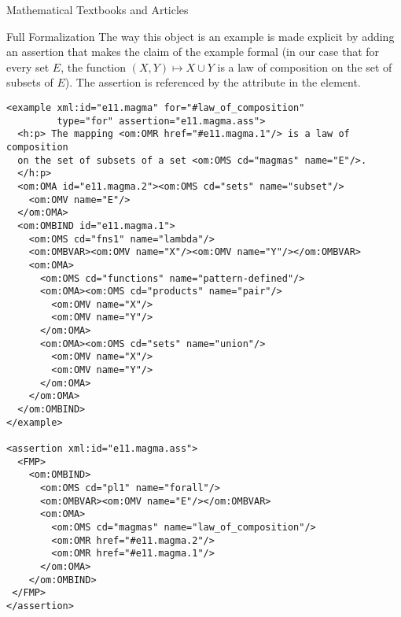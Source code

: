 \begin{omgroup}[short=Textbooks and Articles,id=algebra]{Mathematical Textbooks and Articles}
\begin{omgroup}[id=algebra.formalization]{Full Formalization}
The way this object is an example is made explicit by adding an assertion that makes the
claim of the example formal (in our case that for every set $E$, the function
$(X,Y)\mapsto X\cup Y$ is a law of composition on the set of subsets of $E$). The
assertion is referenced by the {} attribute in the
{} element.

\begin{lstlisting}[label=lst:magma-formal-examples,frame=topline,
    caption={A  formalized magma example},
    index={example,assertion,h:p,FMP,OMS,OMA,OMV}]
<example xml:id="e11.magma" for="#law_of_composition" 
         type="for" assertion="e11.magma.ass">
  <h:p> The mapping <om:OMR href="#e11.magma.1"/> is a law of composition 
  on the set of subsets of a set <om:OMS cd="magmas" name="E"/>.
  </h:p>
  <om:OMA id="e11.magma.2"><om:OMS cd="sets" name="subset"/>
    <om:OMV name="E"/>
  </om:OMA>
  <om:OMBIND id="e11.magma.1">
    <om:OMS cd="fns1" name="lambda"/>
    <om:OMBVAR><om:OMV name="X"/><om:OMV name="Y"/></om:OMBVAR>
    <om:OMA>
      <om:OMS cd="functions" name="pattern-defined"/>
      <om:OMA><om:OMS cd="products" name="pair"/>
        <om:OMV name="X"/>
        <om:OMV name="Y"/>
      </om:OMA>
      <om:OMA><om:OMS cd="sets" name="union"/>
        <om:OMV name="X"/>
        <om:OMV name="Y"/>
      </om:OMA>
    </om:OMA>
  </om:OMBIND>
</example>

<assertion xml:id="e11.magma.ass">
  <FMP>
    <om:OMBIND>
      <om:OMS cd="pl1" name="forall"/>
      <om:OMBVAR><om:OMV name="E"/></om:OMBVAR>
      <om:OMA>
        <om:OMS cd="magmas" name="law_of_composition"/>
        <om:OMR href="#e11.magma.2"/>
        <om:OMR href="#e11.magma.1"/>
      </om:OMA>
    </om:OMBIND>
 </FMP>
</assertion>
\end{lstlisting}          
\end{omgroup}
\end{omgroup}




